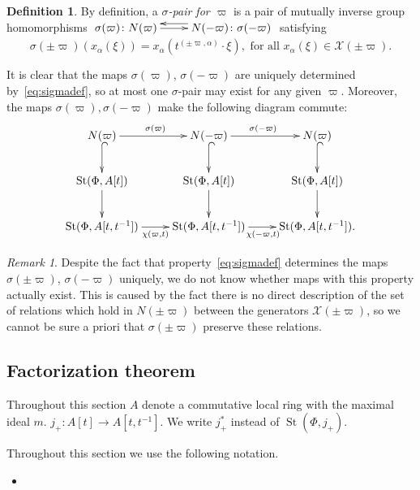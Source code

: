 \documentclass[oneside, 10pt]{amsart}
\DeclareMathOperator{\St}{St}
\newcommand{\XX}{\mathcal{X}}           %
\numberwithin{equation}{section}
\numberwithin{lemma}{section}
\theoremstyle{definition}
\newtheorem{dfn}[lemma]{Definition}
\theoremstyle{remark}
\newtheorem{rem}[lemma]{Remark}
\begin{document}
\begin{dfn} \label{dfn:sigma-pair}
By definition, a {\it $\sigma$-pair for $\varpi$} is a pair of mutually inverse group homomorphisms 
$\xymatrix{ \sigma(\varpi)\colon N(\varpi) \ar[r] & \ar@<-1.0ex>[l] N(-\varpi)\colon \sigma(-\varpi) }$ satisfying
\begin{equation} \label{eq:sigmadef}
\sigma(\pm \varpi)(x_\alpha(\xi)) = x_\alpha(t^{(\pm \varpi, \alpha)}\cdot \xi), 
 \text{ for all } x_\alpha(\xi) \in \XX(\pm\varpi).
\end{equation}\end{dfn}
It is clear that the maps $\sigma(\varpi)$, $\sigma(-\varpi)$ are uniquely determined by~\eqref{eq:sigmadef}, so at most one $\sigma$-pair may exist for any given $\varpi$.
Moreover, the maps $\sigma(\varpi), \sigma(-\varpi)$ make the following diagram commute:
\begin{equation} \label{eq:sigma-diagram}
\xymatrix{ N(\varpi) \ar[r]^{\sigma(\varpi)}\ar@{^{(}->}[d] & N(-\varpi) \ar@{^{(}->}[d] \ar[r]^{\sigma(-\varpi)} & N(\varpi) \ar@{^{(}->}[d] \\ 
          \St(\Phi, A[t]) \ar[d] & \St(\Phi, A[t]) \ar[d] & \St(\Phi, A[t]) \ar[d] \\
          \St(\Phi, A[t, t^{-1}]) \ar@<-0.0ex>[r]_{\chi(\varpi, t)} & \St(\Phi, A[t, t^{-1}]) \ar@<-0.0ex>[r]_{\chi(-\varpi, t)} & \St(\Phi, A[t, t^{-1}]).} \end{equation}  

\begin{rem} Despite the fact that property~\eqref{eq:sigmadef} determines the maps $\sigma(\pm \varpi)$, $\sigma(-\varpi)$ uniquely, 
 we do not know whether maps with this property actually exist.
This is caused by the fact there is no direct description of the set of relations which hold in $N(\pm\varpi)$ between the generators $\XX(\pm\varpi)$, 
 so we cannot be sure a priori that $\sigma(\pm\varpi)$ preserve these relations. \end{rem}

\subsection{Factorization theorem} 
Throughout this section $A$ denote a commutative local ring with the maximal ideal $m$.
$j_+\colon A[t] \to A[t, t^{-1}]$. We write $j_+^*$ instead of $\St(\Phi, j_+)$.
 
Throughout this section we use the following notation.
\begin{itemize}
 \item 
\end{itemize}
\end{document}
